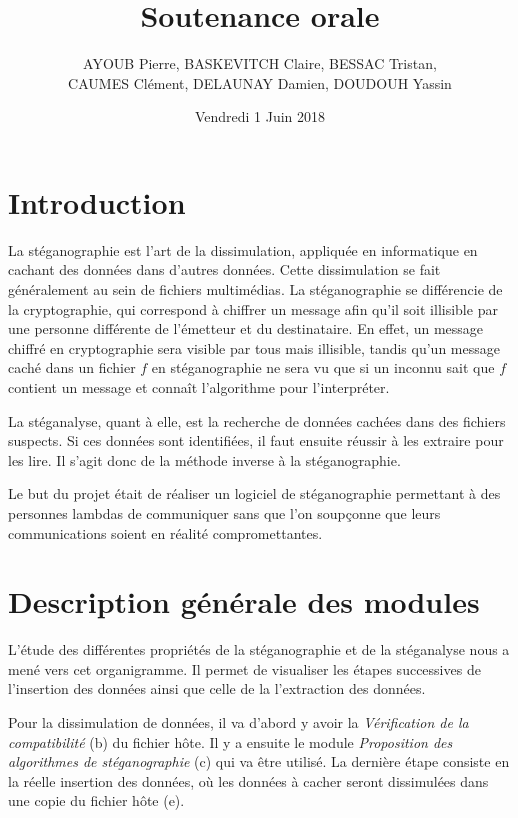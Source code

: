 \documentclass[11pt]{article}
\title{\huge{\textbf Soutenance orale}}
\author{AYOUB Pierre, BASKEVITCH Claire, BESSAC Tristan, \\
CAUMES Clément, DELAUNAY Damien, DOUDOUH Yassin}
\date{Vendredi 1 Juin 2018}
\begin{document}
\maketitle
\vspace{20em}
\newpage

\tableofcontents

\newpage

\section{Introduction}

La stéganographie est l'art de la dissimulation, appliquée en informatique en
cachant des données dans d'autres données. Cette dissimulation se fait
généralement au sein de fichiers multimédias. La stéganographie se différencie
de la cryptographie, qui correspond à chiffrer un message afin qu'il soit
illisible par une personne différente de l'émetteur et du destinataire. En
effet, un message chiffré en cryptographie sera visible par tous mais illisible,
tandis qu'un message caché dans un fichier $f$ en stéganographie ne sera vu que
si un inconnu sait que $f$ contient un message et connaît l'algorithme pour
l'interpréter. 

La stéganalyse, quant à elle, est la recherche de données cachées dans des
fichiers suspects. Si ces données sont identifiées, il faut ensuite réussir à
les extraire pour les lire. Il s'agit donc de la méthode inverse à la
stéganographie. 

Le but du projet était de réaliser un logiciel de stéganographie permettant à des
personnes lambdas de communiquer sans que l'on soupçonne que leurs
communications soient en réalité compromettantes. 

\section{Description générale des modules}

L'étude des différentes propriétés de la stéganographie et de la stéganalyse 
nous a mené vers cet organigramme. 
Il permet de visualiser les étapes successives de l'insertion des données ainsi
que celle de la l'extraction des données.

Pour la dissimulation de données, il va d'abord y avoir la \textit{Vérification 
de la compatibilité} (b) du fichier hôte. 
Il y a ensuite le module \textit{Proposition des algorithmes de stéganographie} 
(c) qui va être utilisé.
La dernière étape consiste en la réelle insertion des données, où les 
données à cacher seront dissimulées dans une copie du fichier hôte (e). 
\end{document}
